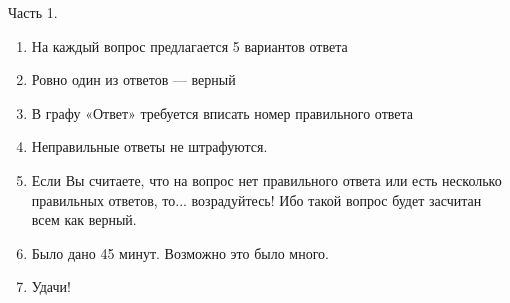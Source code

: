 \documentclass[12pt, a4paper]{article}\usepackage[]{graphicx}\usepackage[]{color}
\begin{document}
				Часть 1.
				\begin{enumerate}
					\item На каждый вопрос предлагается 5 вариантов ответа
					\item Ровно один из ответов — верный
					\item В графу «Ответ» требуется вписать номер правильного ответа
					\item Неправильные ответы не штрафуются.
					\item Если Вы считаете, что на вопрос нет правильного ответа или есть несколько правильных ответов, то... возрадуйтесь! Ибо такой вопрос будет засчитан всем как верный.
					\item Было дано 45 минут. Возможно это было много.
					\item Удачи!
				\end{enumerate}
\end{document}
